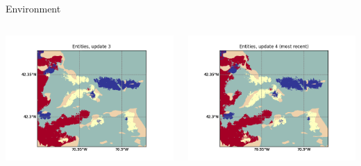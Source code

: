 \documentclass[9pt,xcolor=table]{beamer}
\begin{document}
\begin{frame}{Environment}
\begin{columns}
\begin{column}{0.5\textwidth}
            \includegraphics[width=\textwidth,trim={0cm 0cm 0cm 0cm},clip]{img/e3.png}
        \end{column}
        \begin{column}{0.5\textwidth}
            \includegraphics[width=\textwidth,trim={0cm 0cm 0cm 0cm},clip]{img/e4.png}
        \end{column}
    \end{columns}
\end{frame}
\end{document}
